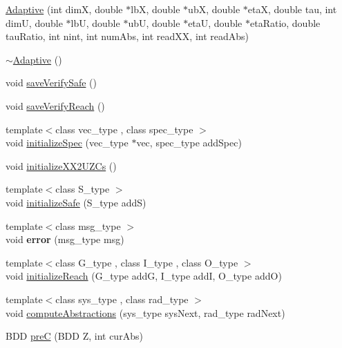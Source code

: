 \begin{DoxyCompactItemize}
\item 
\hyperlink{classscots_1_1Adaptive_a7a6ba80b2a6679ec1194551be3dee698}{Adaptive} (int dimX, double $\ast$lbX, double $\ast$ubX, double $\ast$etaX, double tau, int dimU, double $\ast$lbU, double $\ast$ubU, double $\ast$etaU, double $\ast$eta\+Ratio, double tau\+Ratio, int nint, int num\+Abs, int read\+XX, int read\+Abs)
\item 
\hyperlink{classscots_1_1Adaptive_aa20062d309691c2858912bc3fd9616e7}{$\sim$\+Adaptive} ()
\item 
void \hyperlink{classscots_1_1Adaptive_a629133566055e6445983b86082838b96}{save\+Verify\+Safe} ()
\item 
void \hyperlink{classscots_1_1Adaptive_aed48ef46c84bf6797bea16f896e44e3a}{save\+Verify\+Reach} ()
\item 
{\footnotesize template$<$class vec\+\_\+type , class spec\+\_\+type $>$ }\\void \hyperlink{classscots_1_1Adaptive_aac25a2399ed09b07ef546579c94b0726}{initialize\+Spec} (vec\+\_\+type $\ast$vec, spec\+\_\+type add\+Spec)
\item 
void \hyperlink{classscots_1_1Adaptive_ad7b09416eb224909dcfddcb6487b3b82}{initialize\+X\+X2\+U\+Z\+Cs} ()
\item 
{\footnotesize template$<$class S\+\_\+type $>$ }\\void \hyperlink{classscots_1_1Adaptive_abb37f63b898de0d0013839d3b9d1db2f}{initialize\+Safe} (S\+\_\+type addS)
\item 
\mbox{\label{classscots_1_1Adaptive_a550bbb19126456c000595d7e647edb25}} 
{\footnotesize template$<$class msg\+\_\+type $>$ }\\void {\bfseries error} (msg\+\_\+type msg)
\item 
{\footnotesize template$<$class G\+\_\+type , class I\+\_\+type , class O\+\_\+type $>$ }\\void \hyperlink{classscots_1_1Adaptive_a63afb68f37f6140095c2460d07fc19cb}{initialize\+Reach} (G\+\_\+type addG, I\+\_\+type addI, O\+\_\+type addO)
\item 
{\footnotesize template$<$class sys\+\_\+type , class rad\+\_\+type $>$ }\\void \hyperlink{classscots_1_1Adaptive_af6aeb2170e7223c1396454ab2b83fb09}{compute\+Abstractions} (sys\+\_\+type sys\+Next, rad\+\_\+type rad\+Next)
\item 
B\+DD \hyperlink{classscots_1_1Adaptive_a4a7b7cbccffbff31c135c9d5bd4d7ec0}{preC} (B\+DD Z, int cur\+Abs)

\end{DoxyCompactItemize}
